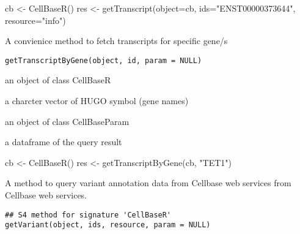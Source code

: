 \documentclass[letterpaper]{book}
\begin{document}
%
\begin{Examples}
\begin{ExampleCode}
   cb <- CellBaseR()
   res <- getTranscript(object=cb, ids="ENST00000373644", resource="info")
\end{ExampleCode}
\end{Examples}
%
\begin{Description}\relax
A convienice method to fetch transcripts for specific gene/s
\end{Description}
%
\begin{Usage}
\begin{verbatim}
getTranscriptByGene(object, id, param = NULL)
\end{verbatim}
\end{Usage}
%
\begin{Arguments}
\begin{ldescription}
\item[\code{object}] an object of class CellBaseR

\item[\code{id}] a charcter vector of HUGO symbol (gene names)

\item[\code{param}] an object of class CellBaseParam
\end{ldescription}
\end{Arguments}
%
\begin{Value}
a dataframe of the query result
\end{Value}
%
\begin{Examples}
\begin{ExampleCode}
cb <- CellBaseR()
res <- getTranscriptByGene(cb, "TET1")
\end{ExampleCode}
\end{Examples}
%
\begin{Description}\relax
A method to query variant annotation data from Cellbase web services from
Cellbase web services.
\end{Description}
%
\begin{Usage}
\begin{verbatim}
## S4 method for signature 'CellBaseR'
getVariant(object, ids, resource, param = NULL)
\end{verbatim}
\end{Usage}
\end{document}

